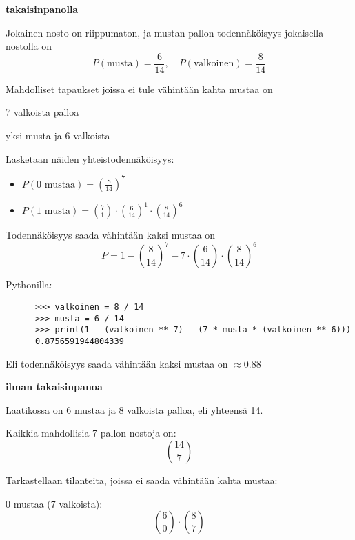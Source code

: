 \documentclass[12pt,a4paper]{article}
\begin{document}
\begin{kohta}

  \item \textbf{takaisinpanolla}

  Jokainen nosto on riippumaton, ja mustan pallon todennäköisyys jokaisella nostolla on
  \[
  P(\text{musta}) = \frac{6}{14}, \quad P(\text{valkoinen}) = \frac{8}{14}
  \]

  Mahdolliset tapaukset joissa ei tule vähintään kahta mustaa on
  \begin{alakohta}
    \item 7 valkoista palloa
    \item yksi musta ja 6 valkoista
  \end{alakohta}

  Lasketaan näiden yhteistodennäköisyys:

  \begin{itemize}
    \item $P(\text{0 mustaa}) = \left(\frac{8}{14}\right)^7$
    \item $P(\text{1 musta}) = \binom{7}{1} \cdot \left(\frac{6}{14}\right)^1 \cdot \left(\frac{8}{14}\right)^6$
  \end{itemize}

  Todennäköisyys saada vähintään kaksi mustaa on
  \[
  P = 1 - \left(\frac{8}{14}\right)^7 - 7 \cdot \left(\frac{6}{14}\right) \cdot \left(\frac{8}{14}\right)^6
  \]

    Pythonilla:
    \begin{verbatim}
      >>> valkoinen = 8 / 14
      >>> musta = 6 / 14
      >>> print(1 - (valkoinen ** 7) - (7 * musta * (valkoinen ** 6)))
      0.8756591944804339
    \end{verbatim}
Eli todennäköisyys saada vähintään kaksi mustaa on $\approx 0.88$




\pagebreak
  \item \textbf{ilman takaisinpanoa}

  Laatikossa on 6 mustaa ja 8 valkoista palloa, eli yhteensä 14.

  Kaikkia mahdollisia 7 pallon nostoja on:
  \[
  \binom{14}{7}
  \]

  Tarkastellaan tilanteita, joissa ei saada vähintään kahta mustaa:

  \begin{alakohta}
    \item 0 mustaa (7 valkoista):
    \[
    \binom{6}{0} \cdot \binom{8}{7}
    \]


\end{alakohta}
\end{kohta}
\end{document}
